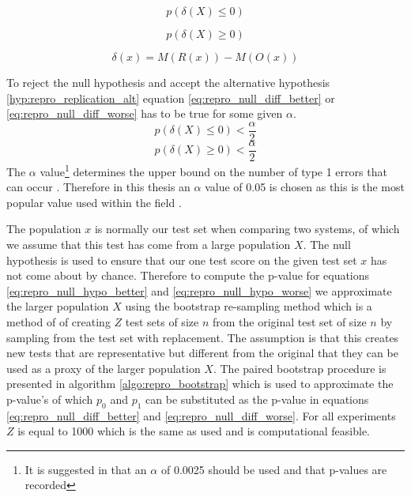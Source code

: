 \begin{equation}
    p(\delta(X) \leq 0)
\label{eq:repro_null_hypo_better}
\end{equation}

\begin{equation}
    p(\delta(X) \geq 0)
\label{eq:repro_null_hypo_worse}
\end{equation}

\begin{equation}
    \delta(x) = M(R(x)) - M(O(x))
\label{eq:repro_score_diff}
\end{equation}

To reject the null hypothesis and accept the alternative hypothesis \ref{hyp:repro_replication_alt} equation \ref{eq:repro_null_diff_better} or \ref{eq:repro_null_diff_worse} has to be true for some given $\alpha$.
\begin{equation}
    p(\delta(X) \leq 0) < \frac{\alpha}{2}
\label{eq:repro_null_diff_better}
\end{equation}
\begin{equation}
    p(\delta(X) \geq 0) < \frac{\alpha}{2}
\label{eq:repro_null_diff_worse}
\end{equation}
The $\alpha$ value\footnote{It is suggested in \citet{repro_sogaard_2014} that an $\alpha$ of 0.0025 should be used and that p-values are recorded} determines the upper bound on the number of type 1 errors that can occur \citep{repro_dror_2018}. Therefore in this thesis an $\alpha$ value of 0.05 is chosen as this is the most popular value used within the field \citep{repro_liu_2017,repro_he_2018}.

The population $x$ is normally our test set when comparing two systems, of which we assume that this test has come from a large population $X$. The null hypothesis is used to ensure that our one test score on the given test set $x$ has not come about by chance. Therefore to compute the p-value for equations \ref{eq:repro_null_hypo_better} and \ref{eq:repro_null_hypo_worse} we approximate the larger population $X$ using the bootstrap re-sampling method which is a method of of creating $Z$ test sets of size $n$ from the original test set of size $n$ by sampling from the test set with replacement. The assumption is that this creates new tests that are representative but different from the original that they can be used as a proxy of the larger population $X$. The paired bootstrap procedure is presented in algorithm \ref{algo:repro_bootstrap} which is used to approximate the p-value's of which $p_0$ and $p_1$ can be substituted as the p-value in equations \ref{eq:repro_null_diff_better} and \ref{eq:repro_null_diff_worse}. For all experiments $Z$ is equal to 1000 which is the same as \citet{repro_koehn_2004} used and is computational feasible. 

